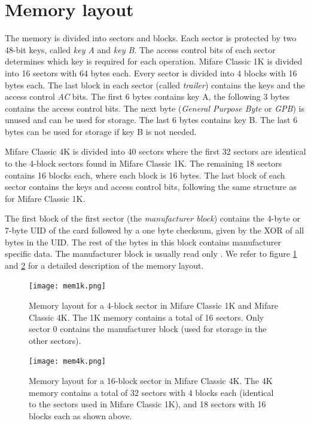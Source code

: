 \documentclass[10pt,twocolumn]{article}
\begin{document}
\section{Memory layout}
The memory is divided into sectors and blocks. Each sector is protected by two 48-bit keys, called \textit{key A} and \textit{key B}. The access control bits of each sector determines which key is required for each operation. Mifare Classic 1K is divided into 16 sectors with 64 bytes each. Every sector is divided into 4 blocks with 16 bytes each. The last block in each sector (called \textit{trailer}) contains the keys and the access control \textit{AC} bits. The first 6 bytes contains key A, the following 3 bytes contains the access control bits. The next byte (\textit{General Purpose Byte} or \textit{GPB}) is unused and can be used for storage. The last 6 bytes contains key B. The last 6 bytes can be used for storage if key B is not needed.

Mifare Classic 4K is divided into 40 sectors where the first 32 sectors are identical to the 4-block sectors found in Mifare Classic 1K. The remaining 18 sectors contains 16 blocks each, where each block is 16 bytes. The last block of each sector contains the keys and access control bits, following the same structure as for Mifare Classic 1K. 

The first block of the first sector (the \textit{manufacturer block}) contains the 4-byte or 7-byte UID of the card followed by a one byte checksum, given by the XOR of all bytes in the UID. The rest of the bytes in this block contains manufacturer specific data. The manufacturer block is usually read only \cite{an1304}. We refer to figure \ref{fig:mem1k} and \ref{fig:mem4k} for a detailed description of the memory layout.

\begin{figure}[ht]
\texttt{[image: mem1k.png]}
\caption{Memory layout for a 4-block sector in Mifare Classic 1K and Mifare Classic 4K. The 1K memory contains a total of 16 sectors. Only sector 0 contains the manufacturer block (used for storage in the other sectors).}
\label{fig:mem1k}
\end{figure}

\begin{figure}[ht]
\texttt{[image: mem4k.png]}
\caption{Memory layout for a 16-block sector in Mifare Classic 4K. The 4K memory contains a total of 32 sectors with 4 blocks each (identical to the sectors used in Mifare Classic 1K), and 18 sectors with 16 blocks each as shown above.}
\label{fig:mem4k}
\end{figure}
\end{document}
